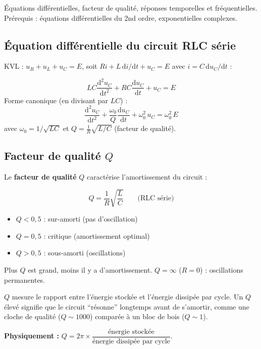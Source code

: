 \documentclass[12pt,a4paper,twoside]{book}
\begin{document}
\begin{approfondissement}
Équations différentielles, facteur de qualité, réponses temporelles et fréquentielles. Prérequis : équations différentielles du 2nd ordre, exponentielles complexes.
\end{approfondissement}

\subsection{Équation différentielle du circuit RLC série}

KVL : $u_R + u_L + u_C = E$, soit $Ri + L\,\mathrm{d}i/\mathrm{d}t + u_C = E$ avec $i = C\,\mathrm{d}u_C/\mathrm{d}t$ :

\begin{formule}
\[
\boxed{LC\frac{\mathrm{d}^2 u_C}{\mathrm{d}t^2} + RC\frac{\mathrm{d}u_C}{\mathrm{d}t} + u_C = E}
\]
Forme canonique (en divisant par $LC$) :
\[
\frac{\mathrm{d}^2 u_C}{\mathrm{d}t^2} + \frac{\omega_0}{Q}\frac{\mathrm{d}u_C}{\mathrm{d}t} + \omega_0^2\, u_C = \omega_0^2\, E
\]
avec $\omega_0 = 1/\sqrt{LC}$ et $Q = \frac{1}{R}\sqrt{L/C}$ (facteur de qualité).
\end{formule}

\subsection{Facteur de qualité $Q$}

Le \textbf{facteur de qualité} $Q$ caractérise l'amortissement du circuit :

\begin{formule}
\[
\boxed{Q = \frac{1}{R}\sqrt{\frac{L}{C}}} \qquad \text{(RLC série)}
\]
\begin{itemize}[nosep]
\item $Q < 0{,}5$ : sur-amorti (pas d'oscillation)
\item $Q = 0{,}5$ : critique (amortissement optimal)
\item $Q > 0{,}5$ : sous-amorti (oscillations)
\end{itemize}
Plus $Q$ est grand, moins il y a d'amortissement. $Q = \infty$ ($R = 0$) : oscillations permanentes.
\end{formule}

\begin{intuition}
$Q$ mesure le rapport entre l'énergie stockée et l'énergie dissipée par cycle. Un $Q$ élevé signifie que le circuit ``résonne'' longtemps avant de s'amortir, comme une cloche de qualité ($Q \sim 1000$) comparée à un bloc de bois ($Q \sim 1$).

\textbf{Physiquement :} $Q = 2\pi \times \dfrac{\text{énergie stockée}}{\text{énergie dissipée par cycle}}$.
\end{intuition}
\end{document}
